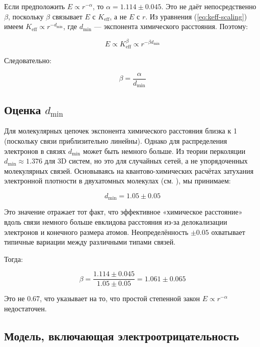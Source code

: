 \documentclass[12pt,a4paper]{article}
\theoremstyle{remark}
\newcommand{\Keff}{K_{\mathrm{eff}}}
\begin{document}
	Если предположить $E \propto r^{-\alpha}$, то $\alpha = 1.114 \pm 0.045$. Это не даёт непосредственно $\beta$, поскольку $\beta$ связывает $E$ с $\Keff$, а не $E$ с $r$. Из уравнения (\ref{eq:keff-scaling}) имеем $\Keff \propto r^{-d_{\text{min}}}$, где $d_{\text{min}}$ — экспонента химического расстояния. Поэтому:
	
	\begin{equation}
		E \propto \Keff^{\beta} \propto r^{-\beta d_{\text{min}}}
		\label{eq:E-r-beta}
	\end{equation}
	
	Следовательно:
	
	\begin{equation}
		\beta = \frac{\alpha}{d_{\text{min}}}
		\label{eq:beta-from-alpha}
	\end{equation}
	
	\subsection{Оценка $d_{\text{min}}$}
	
	Для молекулярных цепочек экспонента химического расстояния близка к 1 (поскольку связи приблизительно линейны). Однако для распределения электронов в связях $d_{\text{min}}$ может быть немного больше. Из теории перколяции $d_{\text{min}} \approx 1.376$ для 3D систем, но это для случайных сетей, а не упорядоченных молекулярных связей. Основываясь на квантово-химических расчётах затухания электронной плотности в двухатомных молекулах (см. \cite{Bader1990}), мы принимаем:
	
	\begin{equation}
		d_{\text{min}} = 1.05 \pm 0.05
		\label{eq:dmin}
	\end{equation}
	
	Это значение отражает тот факт, что эффективное «химическое расстояние» вдоль связи немного больше евклидова расстояния из-за делокализации электронов и конечного размера атомов. Неопределённость $\pm 0.05$ охватывает типичные вариации между различными типами связей.
	
	Тогда:
	
	\begin{equation}
		\beta = \frac{1.114 \pm 0.045}{1.05 \pm 0.05} = 1.061 \pm 0.065
		\label{eq:beta-raw}
	\end{equation}
	
	Это не 0.67, что указывает на то, что простой степенной закон $E \propto r^{-\alpha}$ недостаточен.
	
	\subsection{Модель, включающая электроотрицательность}
	
\end{document}
